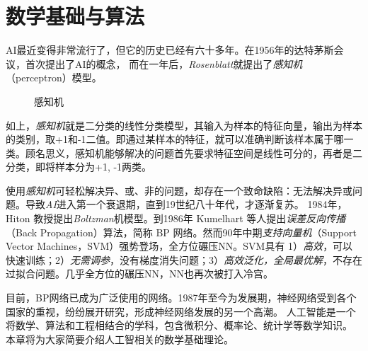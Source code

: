 \part{数学基础与算法}
\label{part:math_learning}

\newpage

AI最近变得非常流行了，但它的历史已经有六十多年。在1956年的达特茅斯会议，首次提出了AI的概念，
而在一年后，\emph{Rosenblatt}就提出了\emph{感知机}（perceptron）模型。


\begin{figure}[!htb]
\setcounter{TempEqCnt}{\value{chapter}}
\setcounter{chapter}{0} 
\centering
{}
\caption{感知机}
\label{fig:part2_math_perceptron}
\end{figure}
\setcounter{chapter}{\value{TempEqCnt}} 

如上，\emph{感知机}就是二分类的线性分类模型，其输入为样本的特征向量，输出为样本的类别，取+1和-1二值。即通过某样本的特征，就可以准确判断该样本属于哪一类。顾名思义，感知机能够解决的问题首先要求特征空间是线性可分的，再者是二分类，即将样本分为{+1, -1}两类。


使用\emph{感知机}可轻松解决异、或、非的问题，却存在一个致命缺陷：无法解决异或问题。导致\emph{AI}进入第一个衰退期，直到19世纪八十年代，才逐渐复苏。
1984年，Hiton 教授提出\emph{Boltzman}机模型。到1986年 Kumelhart 等人提出\emph{误差反向传播}（Back Propagation）算法，简称 BP 网络。然而90年中期\emph{支持向量机}（Support Vector Machines，SVM）强势登场，全方位碾压NN。SVM具有 1）\emph{高效}，可以快速训练；2）\emph{无需调参}，没有梯度消失问题；3）\emph{高效泛化，全局最优解}，不存在过拟合问题。几乎全方位的碾压NN，NN也再次被打入冷宫。


目前，BP网络已成为广泛使用的网络。1987年至今为发展期，神经网络受到各个国家的重视，纷纷展开研究，形成神经网络发展的另一个高潮。
人工智能是一个将数学、算法和工程相结合的学科，包含微积分、概率论、统计学等数学知识。
本章将为大家简要介绍人工智相关的数学基础理论。


% 















